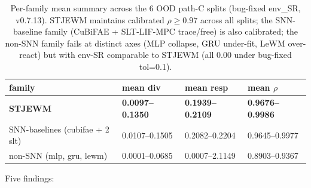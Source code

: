\documentclass{article}
\begin{document}
\begin{table}[ht]
\centering
\small
\begin{tabular}{llll}
\toprule
family & mean div & mean resp & mean $\rho$ \\
\midrule
\textbf{STJEWM} & \textbf{0.0097--0.1350} & \textbf{0.1939--0.2109} & \textbf{0.9676--0.9986} \\
SNN-baselines (cubifae + 2 slt) & 0.0107--0.1505 & 0.2082--0.2204 & 0.9645--0.9977 \\
non-SNN (mlp, gru, lewm) & 0.0001--0.0685 & 0.0007--2.1149 & 0.8903--0.9367 \\
\bottomrule
\end{tabular}
\caption{Per-family mean summary across the 6 OOD path-C splits (bug-fixed env\_SR, v0.7.13). STJEWM maintains calibrated $\rho \geq 0.97$ across all splits; the SNN-baseline family (CuBiFAE + SLT-LIF-MPC trace/free) is also calibrated; the non-SNN family fails at distinct axes (MLP collapse, GRU under-fit, LeWM over-react) but with env-SR comparable to STJEWM (all 0.00 under bug-fixed tol=0.1).}
\label{tab:oodc-per-family}
\end{table}

Five findings:
\end{document}
